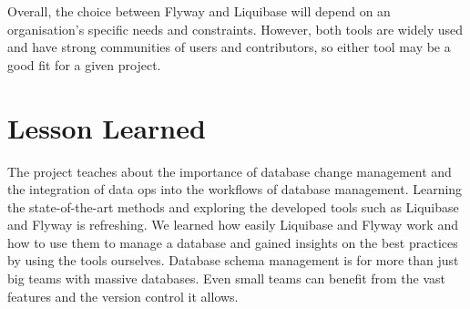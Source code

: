Overall, the choice between Flyway and Liquibase will depend on an organisation's specific needs and constraints. However, both tools are widely used and have strong communities of users and contributors, so either tool may be a good fit for a given project.

\section{Lesson Learned}
The project teaches about the importance of database change management and the integration of data ops into the workflows of database management. Learning the state-of-the-art methods and exploring the developed tools such as Liquibase and Flyway is refreshing. We learned how easily Liquibase and Flyway work and how to use them to manage a database and gained insights on the best practices by using the tools ourselves. Database schema management is for more than just big teams with massive databases. Even small teams can benefit from the vast features and the version control it allows.









